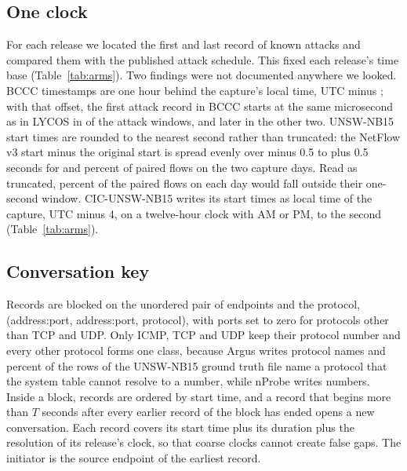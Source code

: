 \documentclass[pdflatex,sn-mathphys-num]{sn-jnl}
\newcommand{\setnum}[1]{#1}
\newcommand{\docnum}[1]{#1}
\theoremstyle{thmstyleone}%
\theoremstyle{thmstylethree}%
\begin{document}
\subsection{One clock}\label{sec:clocks}

For each release we located the first and last record of known attacks and compared them with the published attack schedule. This fixed each release's time base (Table~\ref{tab:arms}). Two findings were not documented anywhere we looked. BCCC timestamps are one hour behind the capture's local time, UTC minus \NbcccOffset{}; with that offset, the first attack record in BCCC starts at the same microsecond as in LYCOS in \NbcccWindowsSame{} of the \NbcccWindows{} attack windows, and later in the other two. UNSW-NB15 start times are rounded to the nearest second rather than truncated: the NetFlow v3 start minus the original start is spread evenly over minus \setnum{0.5} to plus \setnum{0.5} seconds for \NunswOffsetShareA{} and \NunswOffsetShareB{} percent of paired flows on the two capture days. Read as truncated, \NunswTruncOutside{} percent of the paired flows on each day would fall outside their one-second window. CIC-UNSW-NB15 writes its start times as local time of the capture, UTC minus \docnum{4}, on a twelve-hour clock with AM or PM, to the second (Table~\ref{tab:arms}).

\subsection{Conversation key}\label{sec:key}

Records are blocked on the unordered pair of endpoints and the protocol, (address:port, address:port, protocol), with ports set to zero for protocols other than TCP and UDP. Only ICMP, TCP and UDP keep their protocol number and every other protocol forms one class, because Argus writes protocol names and \NprotoUnresolved{} percent of the rows of the UNSW-NB15 ground truth file name a protocol that the system table cannot resolve to a number, while nProbe writes numbers. Inside a block, records are ordered by start time, and a record that begins more than $T$ seconds after every earlier record of the block has ended opens a new conversation. Each record covers its start time plus its duration plus the resolution of its release's clock, so that coarse clocks cannot create false gaps. The initiator is the source endpoint of the earliest record.
\end{document}
